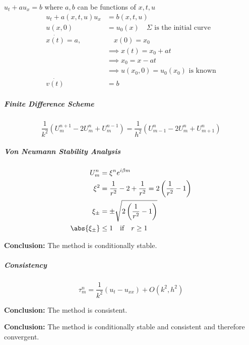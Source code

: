 \begin{example}{}{}
  \(u_t + a u_x = b\) where \(a, b\) can be functions of \(x, t, u\)
  \begin{align*}
    u_t + a(x,t,u)u_x      & = b(x,t,u)                                           \\
    u(x,0)                 & = u_0(x)   \quad \Sigma \text{ is the initial curve} \\
    \dot{x(t)}        = a, & \quad x(0) = x_0                                     \\
                           & \implies x(t) = x_0 + at                             \\
                           & \implies x_0 = x - at                                \\
                           & \implies u(x_0, 0) = u_0(x_0) \text{ is known}       \\
    \dot{v(t)}             & = b
  \end{align*}


\end{example}


\subparagraph{Finite Difference Scheme}
\[
  \frac{1}{k^2}\left( U_m^{n+1} - 2U_m^n + U_m^{n-1} \right) = \frac{1}{h^2}\left( U_{m-1}^n - 2U_m^n + U_{m+1}^n \right)
\]

\subparagraph{Von Neumann Stability Analysis}
\begin{align*}
  U_m^n         & = \xi^n e^{i\beta m}                                                    \\
  \xi^2         & = \frac{1}{r^2} - 2 + \frac{1}{r^2} = 2\left( \frac{1}{r^2} - 1 \right) \\
  \xi_\pm       & = \pm \sqrt{2\left( \frac{1}{r^2} - 1 \right)}                          \\
  \abs{\xi_\pm} & \leq 1 \quad \text{if} \quad r \geq 1
\end{align*}

\textbf{Conclusion:} The method is conditionally stable.

\subparagraph{Consistency}
\[
  \tau_m^n = \frac{1}{k^2}\left( u_t - u_{xx} \right) + O(k^2, h^2)
\]

\textbf{Conclusion:} The method is consistent.

\textbf{Conclusion:} The method is conditionally stable and consistent and therefore convergent.


